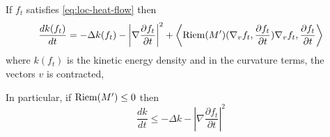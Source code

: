 \begin{theorem}
\label{thm:den-kin}
If \(f_t\) satisfies \eqref{eq:loc-heat-flow} then 
\[
 \frac{d k(f_t)}{dt}= -\Delta k(f_t) - \left|\nabla \frac{\partial f_t}{\partial t}\right|^2 +
\left\langle \mathop{\rm Riem}\nolimits(M') (\nabla_v f_t,\frac{\partial f_t}{\partial t})\nabla_v
f_t,\frac{\partial f_t}{\partial t} \right\rangle
\]
where \(k(f_t)\) is the kinetic energy density and in the curvature terms, the vectors \(v\) is contracted,

In particular, if  \(\mathop{\rm Riem}\nolimits(M') \leq 0\) then
\begin{equation}
\label{eq:den-kin-est}
\frac{d k}{dt} \leq -\Delta k  - \left|\nabla \frac{\partial f_t}{\partial t}\right|^2
\end{equation}
\end{theorem}

